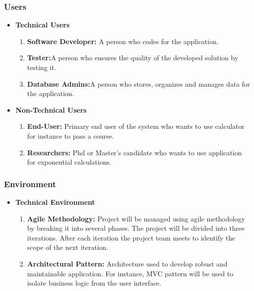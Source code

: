 \documentclass[a4paper,12pt]{report}
\begin{document}
\subsubsection{Users}
\begin{itemize}
    \item \textbf{Technical Users}
    \begin{enumerate}
        \item \textbf{Software Developer:} A person who codes for the application.
        \item \textbf{Tester:}A person who ensures the quality of the developed solution by testing it.
        \item \textbf{Database Admins:}A person who stores, organizes and manages data for the application.
    \end{enumerate}

    \item \textbf{Non-Technical Users}
    \begin{enumerate}
        \item \textbf{End-User:} Primary end user of the system who wants to use calculator for instance to pass a course.
        \item \textbf{Researchers:} Phd or Master's candidate who wants to use application for exponential calculations.

    \end{enumerate}
\end{itemize}

\subsubsection{Environment}
\begin{itemize}
    \item \textbf{Technical Environment}
    \begin{enumerate}
        \item \textbf{Agile Methodology:} Project will be managed using agile methodology by breaking it into several phases. The project will be divided into three iterations. After each iteration the project team meets to identify the scope of the next iteration.
        \item \textbf{Architectural Pattern:} Architecture used to develop robust and maintainable application. For instance, MVC pattern will be used to isolate business logic from the user interface.

    \end{enumerate}

\end{itemize}
\end{document}
